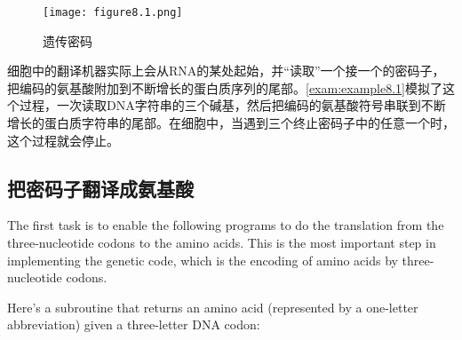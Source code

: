 \begin{figure}
  \centering
  \texttt{[image: figure8.1.png]}
  \caption{遗传密码}
  \label{fig:figure8.1}
\end{figure}

细胞中的翻译机器实际上会从RNA的某处起始，并“读取”一个接一个的密码子，把编码的氨基酸附加到不断增长的蛋白质序列的尾部。\autoref{exam:example8.1}模拟了这个过程，一次读取DNA字符串的三个碱基，然后把编码的氨基酸符号串联到不断增长的蛋白质字符串的尾部。在细胞中，当遇到三个终止密码子中的任意一个时，这个过程就会停止。

\subsection{把密码子翻译成氨基酸}
The first task is to enable the following programs to do the translation from the three-nucleotide codons to the amino acids. This is the most important step in implementing the genetic code, which is the encoding of amino acids by three-nucleotide codons.

Here's a subroutine that returns an amino acid (represented by a one-letter abbreviation) given a three-letter DNA codon: 


